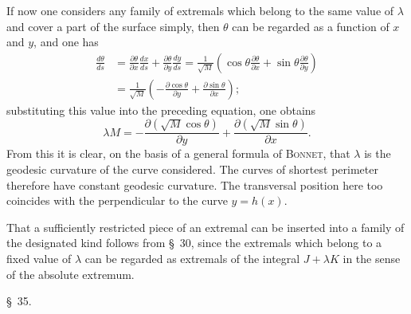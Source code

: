 \documentclass[11pt,a4paper,leqno]{article}
\begin{document}
If now one considers any family of extremals which belong to the same value of $\lambda$ and cover a part of the surface simply, then $\theta$ can be regarded as a function of $x$ and $y$, and one has
\[
\begin{aligned}
\frac{d\theta}{ds}&=\frac{\partial\theta}{\partial x}\frac{dx}{ds}+
\frac{\partial\theta}{\partial y}\frac{dy}{ds}
=\frac{1}{\sqrt{M}}\left(\cos\theta\frac{\partial\theta}{\partial x}+
\sin\theta\frac{\partial\theta}{\partial y}\right)\\
&=\frac{1}{\sqrt{M}}\left(-\frac{\partial\cos\theta}{\partial y}+
\frac{\partial\sin\theta}{\partial x}\right);
\end{aligned}
\]
substituting this value into the preceding equation, one obtains
\[
\lambda M=-\frac{\partial(\sqrt{M}\cos\theta)}{\partial y}+
\frac{\partial(\sqrt{M}\sin\theta)}{\partial x}.
\]
From this it is clear, on the basis of a general formula of \textsc{Bonnet}, that $\lambda$ is the geodesic curvature of the curve considered. The curves of shortest perimeter therefore have constant geodesic curvature. The transversal position here too coincides with the perpendicular to the curve $y=h(x)$.

That a sufficiently restricted piece of an extremal can be inserted into a family of the designated kind follows from \S~30, since the extremals which belong to a fixed value of $\lambda$ can be regarded as extremals of the integral $J+\lambda K$ in the sense of the absolute extremum.

\begin{center}{\large \S~35.}\end{center}
\end{document}

